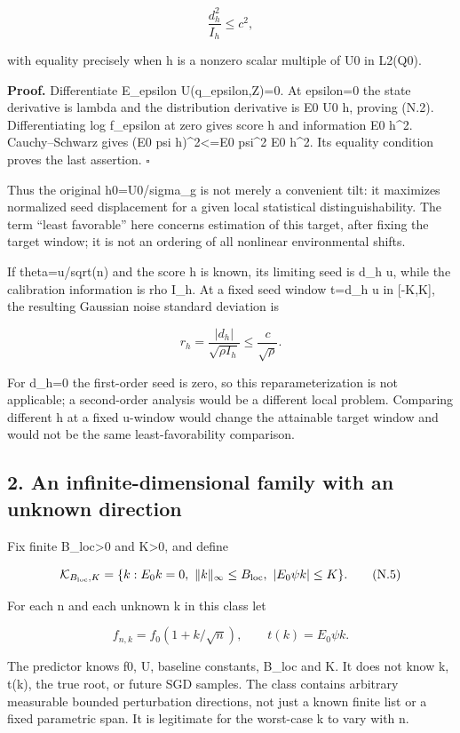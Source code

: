 \[
\boxed{\frac{d_h^2}{I_h}\le c^2,}
\tag{N.3}
\]

with equality precisely when h is a nonzero scalar multiple of U0 in
L2(Q0).

\textbf{Proof.} Differentiate E\_epsilon U(q\_epsilon,Z)=0. At epsilon=0
the state derivative is lambda and the distribution derivative is E0 U0
h, proving (N.2). Differentiating log f\_epsilon at zero gives score h
and information E0 h\^{}2. Cauchy--Schwarz gives (E0 psi
h)\^{}2\textless=E0 psi\^{}2 E0 h\^{}2. Its equality condition proves
the last assertion. \(\square\)

Thus the original h0=U0/sigma\_g is not merely a convenient tilt: it
maximizes normalized seed displacement for a given local statistical
distinguishability. The term ``least favorable'' here concerns
estimation of this target, after fixing the target window; it is not an
ordering of all nonlinear environmental shifts.

If theta=u/sqrt(n) and the score h is known, its limiting seed is d\_h
u, while the calibration information is rho I\_h. At a fixed seed window
t=d\_h u in {[}-K,K{]}, the resulting Gaussian noise standard deviation
is

\[
r_h=\frac{|d_h|}{\sqrt{\rho I_h}}\le\frac c{\sqrt\rho}.
\tag{N.4}
\]

For d\_h=0 the first-order seed is zero, so this reparameterization is
not applicable; a second-order analysis would be a different local
problem. Comparing different h at a fixed u-window would change the
attainable target window and would not be the same least-favorability
comparison.

\subsection{2. An infinite-dimensional family with an unknown
direction}\label{an-infinite-dimensional-family-with-an-unknown-direction}

Fix finite B\_loc\textgreater0 and K\textgreater0, and define

\[
\mathcal K_{B_{\rm loc},K}
=\{k:E_0k=0,\ \|k\|_\infty\le B_{\rm loc},\ |E_0\psi k|\le K\}.
\tag{N.5}
\]

For each n and each unknown k in this class let

\[
f_{n,k}=f_0(1+k/\sqrt n),\qquad t(k)=E_0\psi k.
\]

The predictor knows f0, U, baseline constants, B\_loc and K. It does not
know k, t(k), the true root, or future SGD samples. The class contains
arbitrary measurable bounded perturbation directions, not just a known
finite list or a fixed parametric span. It is legitimate for the
worst-case k to vary with n.

